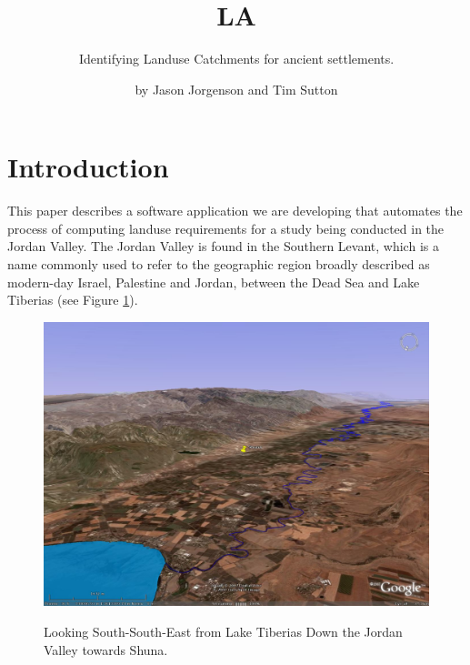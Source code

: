

\title{LA} \subtitle{Identifying Landuse Catchments for 
ancient settlements.}

\author{by Jason Jorgenson and Tim Sutton}

\maketitle

\section{Introduction} \label{sec:Introduction}

This paper describes a software application we are developing that automates
the process of computing landuse requirements for a study being conducted in
the Jordan Valley. The Jordan Valley is found in the Southern Levant, which is
a name commonly used to refer to the geographic region broadly described as
modern-day Israel, Palestine and Jordan, between the Dead Sea and Lake
Tiberias (see Figure \ref{fig:shunaGoogleEarth}).

\begin{figure}[htbp] %
\includegraphics[scale=0.17]{./images/ShunaGoogleEarth3D.jpg}
\label{fig:shunaGoogleEarth} \caption{Looking South-South-East from Lake
Tiberias Down the Jordan Valley towards Shuna.} \end{figure}

